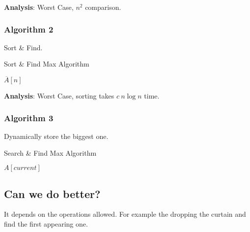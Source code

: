 \textbf{Analysis}: Worst Case, $n^2$ comparison.

\subsubsection{Algorithm 2}

Sort \& Find.

\begin{algorithm}[H]
\caption{Sort \& Find Max Algorithm}\label{Sort_and_Find_Max_Algorithm}
\begin{algorithmic}[1]
\Return $\overline{A}[n]$
\EndProcedure
\end{algorithmic}
\end{algorithm}

\textbf{Analysis}: Worst Case, sorting takes $c\ n\log n$ time.

\subsubsection{Algorithm 3}

Dynamically store the biggest one.

\begin{algorithm}[H]
\caption{Search \& Find Max Algorithm}\label{Search_and_Find_Max_Algorithm}
\begin{algorithmic}[1]
  \EndIf
\EndFor
\Return $A[current]$
\EndProcedure
\end{algorithmic}
\end{algorithm}

\subsection{Can we do better?}

It depends on the operations allowed. For example the dropping the curtain and
find the first appearing one.
